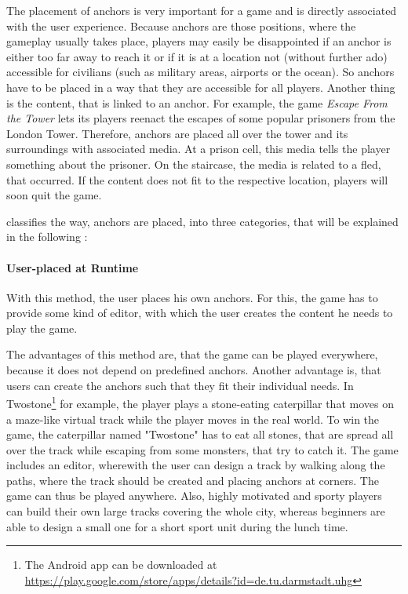 The placement of anchors is very important for a game and is directly associated with the user experience. Because anchors are those positions, where the gameplay usually takes place, players may easily be disappointed if an anchor is either too far away to reach it or if it is at a location not (without further ado) accessible for civilians (such as military areas, airports or the ocean). So anchors have to be placed in a way that they are accessible for all players.
Another thing is the content, that is linked to an anchor. For example, the game \emph{Escape From the Tower} \citep{EscapeFromTheTower} lets its players reenact the escapes of some popular prisoners from the London Tower. Therefore, anchors are placed all over the tower and its surroundings with associated media. At a prison cell, this media tells the player something about the prisoner. On the staircase, the media is related to a fled, that occurred. If the content does not fit to the respective location, players will soon quit the game.

\citeauthor{reid2008design} classifies the way, anchors are placed, into three categories, that will be explained in the following \citep{reid2008design}:

\paragraph{User-placed at Runtime}
With this method, the user places his own anchors. For this, the game has to provide some kind of editor, with which the user creates the content he needs to play the game.

The advantages of this method are, that the game can be played everywhere, because it does not depend on predefined anchors. Another advantage is, that users can create the anchors such that they fit their individual needs. In Twostone\footnote{The Android app can be downloaded at \url{https://play.google.com/store/apps/details?id=de.tu.darmstadt.uhg}} for example, the player plays a stone-eating caterpillar that moves on a maze-like virtual track while the player moves in the real world. To win the game, the caterpillar named "Twostone" has to eat all stones, that are spread all over the track while escaping from some monsters, that try to catch it. The game includes an editor, wherewith the user can design a track by walking along the paths, where the track should be created and placing anchors at corners. The game can thus be played anywhere. Also, highly motivated and sporty players can build their own large tracks covering the whole city, whereas beginners are able to design a small one for a short sport unit during the lunch time.

